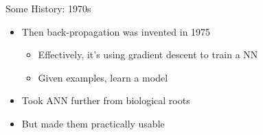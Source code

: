 \documentclass[aspectratio=169]{beamer}
\begin{document}
\begin{frame}{Some History: 1970s}

\begin{itemize}
	\item Then back-propagation was invented in 1975
	\begin{itemize}
		\item Effectively, it's using gradient descent to train a NN
		\item Given examples, learn a model
	\end{itemize}
	\item Took ANN further from biological roots
	\item But made them practically usable
	
\end{itemize}
\end{frame}
\end{document}
